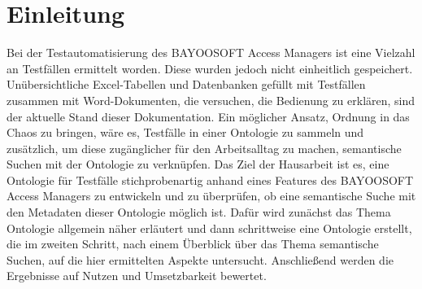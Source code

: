 \chapter{Einleitung}
Bei der Testautomatisierung des BAYOOSOFT Access Managers ist eine Vielzahl an Testfällen ermittelt worden. Diese wurden jedoch nicht einheitlich gespeichert. Unübersichtliche Excel-Tabellen und Datenbanken gefüllt mit Testfällen zusammen mit Word-Dokumenten, die versuchen, die Bedienung zu erklären, sind der aktuelle Stand dieser Dokumentation. Ein möglicher Ansatz, Ordnung in das Chaos zu bringen, wäre es, Testfälle in einer Ontologie zu sammeln und zusätzlich, um diese zugänglicher für den Arbeitsalltag zu machen, semantische Suchen mit der Ontologie zu verknüpfen. Das Ziel der Hausarbeit ist es, eine Ontologie für Testfälle stichprobenartig anhand eines Features des BAYOOSOFT Access Managers zu entwickeln und zu überprüfen, ob eine semantische Suche mit den Metadaten dieser Ontologie möglich ist. Dafür wird zunächst das Thema Ontologie allgemein näher erläutert und dann schrittweise eine Ontologie erstellt, die im zweiten Schritt, nach einem Überblick über das Thema semantische Suchen, auf die hier ermittelten Aspekte untersucht. Anschließend werden die Ergebnisse auf Nutzen und Umsetzbarkeit bewertet.